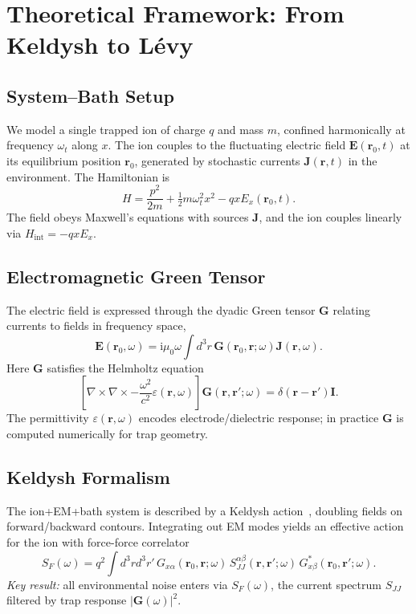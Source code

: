 \section{Theoretical Framework: From Keldysh to L\'evy}
\label{sec:theory_foundations}

\subsection{System--Bath Setup}
We model a single trapped ion of charge $q$ and mass $m$, confined harmonically at frequency $\omega_t$ along $x$.
The ion couples to the fluctuating electric field $\mathbf{E}(\mathbf{r}_0,t)$ at its equilibrium position $\mathbf{r}_0$, generated by stochastic currents $\mathbf{J}(\mathbf{r},t)$ in the environment.
The Hamiltonian is
\begin{equation}
H = \frac{p^2}{2m} + \tfrac{1}{2} m \omega_t^2 x^2 - q x E_x(\mathbf{r}_0,t).
\end{equation}
The field obeys Maxwell's equations with sources $\mathbf{J}$, and the ion couples linearly via $H_{\text{int}} = -q x E_x$.

\subsection{Electromagnetic Green Tensor}
The electric field is expressed through the dyadic Green tensor $\mathbf{G}$ relating currents to fields in frequency space,
\begin{equation}
\mathbf{E}(\mathbf{r}_0,\omega) = \mathrm{i}\mu_0 \omega \int d^3r\, \mathbf{G}(\mathbf{r}_0,\mathbf{r};\omega) \mathbf{J}(\mathbf{r},\omega).
\end{equation}
Here $\mathbf{G}$ satisfies the Helmholtz equation
\begin{equation}
\left[\nabla\times\nabla\times - \frac{\omega^2}{c^2}\varepsilon(\mathbf{r},\omega)\right]\mathbf{G}(\mathbf{r},\mathbf{r}';\omega) = \delta(\mathbf{r}-\mathbf{r}')\mathbf{I}.
\end{equation}
The permittivity $\varepsilon(\mathbf{r},\omega)$ encodes electrode/dielectric response; in practice $\mathbf{G}$ is computed numerically for trap geometry.

\subsection{Keldysh Formalism}
The ion+EM+bath system is described by a Keldysh action~\cite{Kamenev2011}, doubling fields on forward/backward contours.
Integrating out EM modes yields an effective action for the ion with force-force correlator
\begin{equation}
S_F(\omega) = q^2 \int d^3r d^3r'\, G_{x\alpha}(\mathbf{r}_0,\mathbf{r};\omega)\, S_{JJ}^{\alpha\beta}(\mathbf{r},\mathbf{r}';\omega)\, G^*_{x\beta}(\mathbf{r}_0,\mathbf{r}';\omega).
\label{eq:SF}
\end{equation}
\textit{Key result:} all environmental noise enters via $S_F(\omega)$, the current spectrum $S_{JJ}$ filtered by trap response $|\mathbf{G}(\omega)|^2$.


